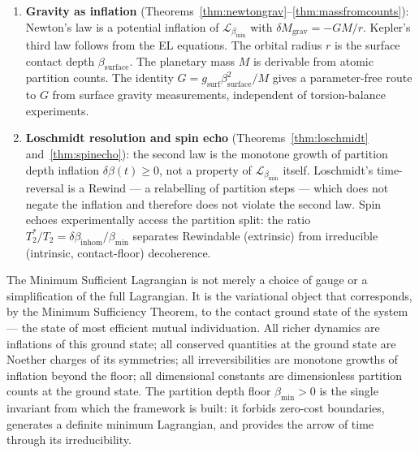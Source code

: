 \documentclass[11pt,twocolumn,a4paper]{article}
\theoremstyle{plain}
\theoremstyle{definition}
\theoremstyle{remark}
\newcommand{\bmin}{\beta_{\min}}
\newcommand{\Lmin}{\mathcal{L}_{\bmin}}
\begin{document}
\begin{enumerate}
\item \textbf{Gravity as inflation} (Theorems~\ref{thm:newtongrav}--\ref{thm:massfromcounts}):
  Newton's law is a potential inflation of $\Lmin$ with $\delta M_{\mathrm{grav}}
  = -GM/r$. Kepler's third law follows from the EL equations. The orbital
  radius $r$ is the surface contact depth $\beta_{\mathrm{surface}}$. The
  planetary mass $M$ is derivable from atomic partition counts. The identity
  $G = g_{\mathrm{surf}}\beta_{\mathrm{surface}}^2/M$ gives a parameter-free
  route to $G$ from surface gravity measurements, independent of torsion-balance
  experiments.

\item \textbf{Loschmidt resolution and spin echo} (Theorems~\ref{thm:loschmidt}
  and~\ref{thm:spinecho}): the second law is the monotone growth of partition
  depth inflation $\delta\beta(t) \geq 0$, not a property of $\Lmin$ itself.
  Loschmidt's time-reversal is a Rewind --- a relabelling of partition steps
  --- which does not negate the inflation and therefore does not violate the
  second law. Spin echoes experimentally access the partition split: the ratio
  $T_2^*/T_2 = \delta\beta_{\mathrm{inhom}}/\bmin$ separates Rewindable
  (extrinsic) from irreducible (intrinsic, contact-floor) decoherence.
\end{enumerate}

The Minimum Sufficient Lagrangian is not merely a choice of gauge or a
simplification of the full Lagrangian. It is the variational object that
corresponds, by the Minimum Sufficiency Theorem, to the contact ground state
of the system --- the state of most efficient mutual individuation. All richer
dynamics are inflations of this ground state; all conserved quantities at the
ground state are Noether charges of its symmetries; all irreversibilities are
monotone growths of inflation beyond the floor; all dimensional constants are
dimensionless partition counts at the ground state. The partition depth floor
$\bmin > 0$ is the single invariant from which the framework is built: it
forbids zero-cost boundaries, generates a definite minimum Lagrangian, and
provides the arrow of time through its irreducibility.



\end{document}
